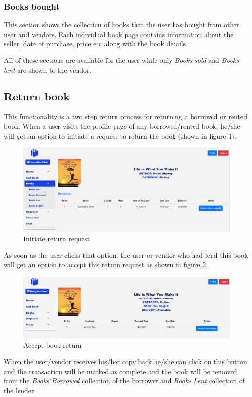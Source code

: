 \documentclass[conference]{IEEEtran}
\begin{document}
\subsubsection{Books bought}
This section shows the collection of books that the user has bought from other user and vendors. Each individual book page contains information about the seller, date of purchase, price etc along with the book details.

All of these sections are available for the user while only \emph{Books sold} and \emph{Books lent} are shown to the vendor.

\subsection{Return book}
This functionality is a two step return process for returning a borrowed or rented book. When a user visits the profile page of any borrowed/rented book, he/she will get an option to initiate a request to return the book (shown in figure \ref{fig:initiatereturnrequest}).
\begin{figure}[h]
     \centering
     \includegraphics[scale=0.20,margin=2,frame]{initiatereturnrequest.PNG}
     \caption{Initiate return request}
     \label{fig:initiatereturnrequest}
 \end{figure}
As soon as the user clicks that option, the user or vendor who had lend this book will get an option to accept this return request as shown in figure \ref{fig:acceptbookreturn}. 
\begin{figure}[h]
     \centering
     \includegraphics[scale=0.20,margin=2,frame]{acceptbookreturn.PNG}
     \caption{Accept book return}
     \label{fig:acceptbookreturn}
 \end{figure}
When the user/vendor receives his/her copy back he/she can click on this button and the transaction will be marked as complete and the book will be removed from the \emph{Books Borrowed} collection of the borrower and \emph{Books Lent} collection of the lender.
\end{document}

